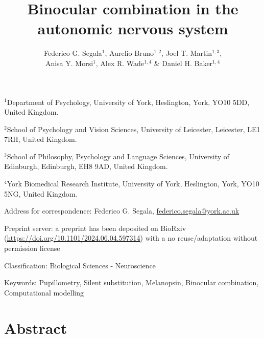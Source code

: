 \documentclass[
]{article}
\title{Binocular combination in the autonomic nervous system}
\author{Federico G. Segala\(^1\), Aurelio Bruno\(^{1,2}\), Joel T. Martin\(^{1,3}\),\\
Anisa Y. Morsi\(^1\), Alex R. Wade\(^{1,4}\) \& Daniel H. Baker\(^{1,4}\)}
\date{}
\begin{document}
\maketitle

\(^1\)Department of Psychology, University of York, Heslington, York, YO10 5DD, United Kingdom.

\(^2\)School of Psychology and Vision Sciences, University of Leicester, Leicester, LE1 7RH, United Kingdom.

\(^3\)School of Philosophy, Psychology and Language Sciences, University of Edinburgh, Edinburgh, EH8 9AD, United Kingdom.

\(^4\)York Biomedical Research Institute, University of York, Heslington, York, YO10 5NG, United Kingdom.

Address for correspondence: Federico G. Segala, \url{federico.segala@york.ac.uk}

Preprint server: a preprint has been deposited on BioRxiv (\url{https://doi.org/10.1101/2024.06.04.597314}) with a no reuse/adaptation without permission license

Classification: Biological Sciences - Neuroscience

Keywords: Pupillometry, Silent substitution, Melanopsin, Binocular combination, Computational modelling

\hypertarget{abstract}{%
\section{Abstract}\label{abstract}}
\end{document}
